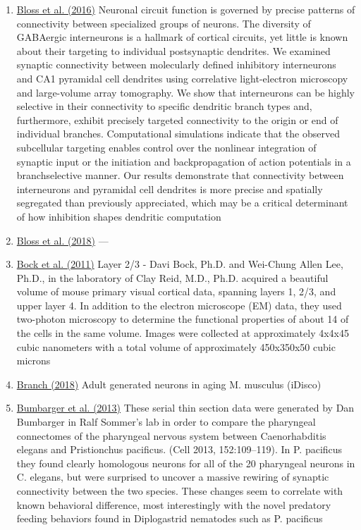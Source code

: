 \documentclass[10pt,colorlinks=true,urlcolor=blue]{moderncv}
\begin{document}
\begin{enumerate}
    \item \href{https://neurodata.io/data/bloss2016}{Bloss et al. (2016)} 
        Neuronal circuit function is governed by precise patterns of connectivity between specialized groups of neurons. The diversity of GABAergic interneurons is a hallmark of cortical circuits, yet little is known about their targeting to individual postsynaptic dendrites. We examined synaptic connectivity between molecularly defined inhibitory interneurons and CA1 pyramidal cell dendrites using correlative light-electron microscopy and large-volume array tomography. We show that interneurons can be highly selective in their connectivity to specific dendritic branch types and, furthermore, exhibit precisely targeted connectivity to the origin or end of individual branches. Computational simulations indicate that the observed subcellular targeting enables control over the nonlinear integration of synaptic input or the initiation and backpropagation of action potentials in a branchselective manner. Our results demonstrate that connectivity between interneurons and pyramidal cell dendrites is more precise and spatially segregated than previously appreciated, which may be a critical determinant of how inhibition shapes dendritic computation%

    \item \href{https://neurodata.io/data/bloss2018}{Bloss et al. (2018)} 
        ---%

    \item \href{https://neurodata.io/data/bock11}{Bock et al.  (2011)} 
        Layer 2/3 - Davi Bock, Ph.D. and Wei-Chung Allen Lee, Ph.D., in the laboratory of Clay Reid, M.D., Ph.D. acquired a beautiful volume of mouse primary visual cortical data, spanning layers 1, 2/3, and upper layer 4. In addition to the electron microscope (EM) data, they used two-photon microscopy to determine the functional properties of about 14 of the cells in the same volume. Images were collected at approximately 4x4x45 cubic nanometers with a total volume of approximately 450x350x50 cubic microns%

    \item \href{https://neurodata.io/data/branch18}{Branch (2018)}
        Adult generated neurons in aging M. musculus (iDisco)%

    \item \href{https://neurodata.io/data/bumbarger13}{Bumbarger et al. (2013)}
        These serial thin section data were generated by Dan Bumbarger in Ralf Sommer's lab in order to compare the pharyngeal connectomes of the pharyngeal nervous system between Caenorhabditis elegans and Pristionchus pacificus. (Cell 2013, 152:109–119). In P. pacificus they found clearly homologous neurons for all of the 20 pharyngeal neurons in C. elegans, but were surprised to uncover a massive rewiring of synaptic connectivity between the two species. These changes seem to correlate with known behavioral difference, most interestingly with the novel predatory feeding behaviors found in Diplogastrid nematodes such as P. pacificus%


\end{enumerate}
\end{document}
